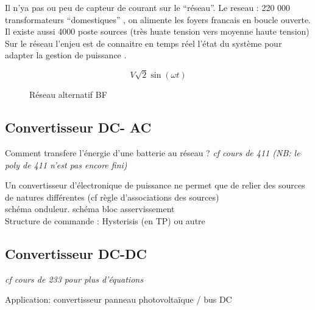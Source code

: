 \documentclass[main.tex]{subfiles}
\begin{document}
Il n'ya pas ou peu de capteur de courant sur le ``réseau''. 
Le reseau : 220 000 transformateurs ``domestiques'' , on alimente les foyers francais en boucle ouverte. Il existe aussi 4000 poste sources
(très huate tension vers moyenne haute tension)
Sur le réseau l'enjeu est de connaitre en temps réel l'état du système pour adapter la gestion de puissance .

\begin{figure}[H]
  \centering
  \[
    V \sqrt{2}\sin(\omega t)
  \]
  \caption{Réseau alternatif BF}
\end{figure}
\subsection{Convertisseur DC- AC}
Comment transfere l'énergie d'une batterie au réseau ?
\emph{cf cours de 411 (NB: le poly de 411 n'est pas encore fini)}

Un convertisseur d'électronique de puissance ne permet que de relier des sources de natures différentes (cf règle d'associations des sources)\\


schéma onduleur. schéma bloc asservissement\\


Structure de commande : Hysterisis (en TP) ou autre

\subsection{Convertisseur DC-DC}
\emph{cf cours de 233  pour plus d'équations}

Application: convertisseur panneau photovoltaïque / bus DC
\end{document}
